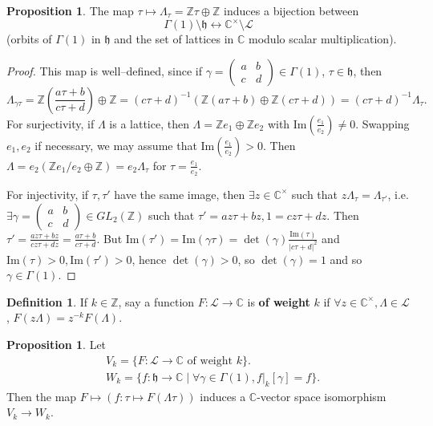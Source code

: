 \documentclass{article}
\theoremstyle{definition}
\newtheorem{prop}[theorem]{Proposition}
\newtheorem{defn}{Definition}[section]
\begin{document}
\begin{prop}
    The map $\tau \mapsto \Lambda_\tau = \mathbb{Z} \tau \oplus \mathbb{Z}$ induces a bijection between $$\Gamma(1)\setminus \mathfrak{h} \leftrightarrow \mathbb{C}^\times\setminus \mathcal{L}$$ (orbits of $\Gamma(1)$ in $\mathfrak{h}$ and the set of lattices in $\mathbb{C}$ modulo scalar multiplication).
\end{prop}
\begin{proof}
    This map is well--defined, since if $\gamma = \begin{pmatrix} a & b\\ c&d \end{pmatrix} \in \Gamma(1)$, $\tau \in \mathfrak{h}$, then \[
    \Lambda_{\gamma \tau} = \mathbb{Z} \left(\frac{a \tau +b}{c \tau +d }\right) \oplus \mathbb{Z} = (c \tau + d)^{-1} \left(\mathbb{Z}(a \tau +b) \oplus \mathbb{Z}(c \tau + d)\right) = (c \tau + d)^{-1} \Lambda_{\tau}.
    \]
    For surjectivity, if $\Lambda$ is a lattice, then $\Lambda = \mathbb{Z}e_1 \oplus \mathbb{Z}e_2$ with $\text{Im}\left(\frac{e_1}{e_2}\right) \neq 0$. Swapping $e_1,e_2$ if necessary, we may assume that $\text{Im}\left(\frac{e_1}{e_2}\right)>0$. Then $\Lambda = e_2(\mathbb{Z}e_1/e_2 \oplus \mathbb{Z}) = e_2 \Lambda_\tau$ for $\tau = \frac{e_1}{e_2}$.
    \vspace{1mm}
     
    For injectivity, if $\tau,\tau'$ have the same image, then $\exists z \in \mathbb{C}^\times$ such that $z\Lambda_\tau = \Lambda_{\tau'}$, i.e. $\exists  \gamma = \begin{pmatrix} a&b\\c&d \end{pmatrix} \in GL_2(\mathbb{Z})$ such that $\tau' = az\tau + bz, 1 = cz \tau + dz$. Then $\tau' =\frac{az \tau + bz}{c z \tau + dz} = \frac{a \tau + b}{c \tau + d}$. But $\text{Im}(\tau') = \text{Im}(\gamma \tau) = \det(\gamma)\frac{\text{Im}(\tau)}{|c \tau + d|^2}$ and $\text{Im}(\tau)>0, \text{Im}(\tau')>0$, hence $\det(\gamma)>0$, so $\det(\gamma)=1$ and so $\gamma \in \Gamma(1)$. 
\end{proof}
\begin{defn}
If $k \in \mathbb{Z}$, say a function $F: \mathcal{L} \to \mathbb{C}$ is \textbf{of weight} $k$ if $\forall  z \in \mathbb{C}^\times, \Lambda \in \mathcal{L}$, $F(z \Lambda) = z^{-k}F(\Lambda)$.
\end{defn}
\begin{prop}
    Let 
    \begin{align*}
        &V_k = \{F : \mathcal{L} \to \mathbb{C} \text{ of weight }k\}.\\
        &W_k = \{f : \mathfrak{h} \to \mathbb{C} \mid \forall \gamma \in \Gamma(1), f|_k[\gamma] = f\}.
    \end{align*}
    Then the map $F \mapsto (f : \tau \mapsto F(\Lambda \tau))$ induces a $\mathbb{C}$-vector space isomorphism $V_k \to W_k$.
\end{prop}
\end{document}
